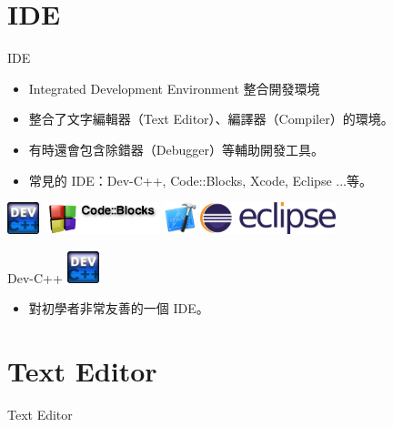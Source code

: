\documentclass[t]{beamer}
\begin{document}
\section{IDE}
\begin{frame}{IDE}
  \begin{itemize}
    \item Integrated Development Environment 整合開發環境
    \item 整合了文字編輯器（Text Editor）、編譯器（Compiler）的環境。
    \item 有時還會包含除錯器（Debugger）等輔助開發工具。
    \item 常見的 IDE：Dev-C++, Code::Blocks, Xcode, Eclipse ...等。
  \end{itemize}
  \begin{center}
    \includegraphics[height=2.5em]{dev.png}
    \hspace{1em}
    \includegraphics[height=2.5em]{cb.png}
    \hspace{1em}
    \includegraphics[height=2.5em]{xcode.png}
    \hspace{1em}
    \includegraphics[height=2.5em]{eclipse.png}
  \end{center}
\end{frame}

\begin{frame}{Dev-C++}
  \includegraphics[height=2.5em]{dev.png}
  \begin{itemize}
    \item 對初學者非常友善的一個 IDE。
  \end{itemize}
\end{frame}

\section{Text Editor}
\begin{frame}{Text Editor}
\end{frame}
\end{document}
